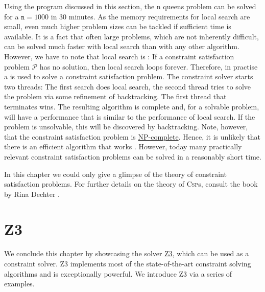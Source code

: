 Using the program discussed in this section, the n queens problem can be solved for a $\texttt{n} = 1000$ in
30 minutes.  As the memory requirements for local search are small, even much higher problem sizes can be
tackled if sufficient time is available.  It is a fact that often large problems, which are not inherently
difficult, can be solved much faster with local search than with any other algorithm.  
However, we have to note that local search is :  If a
constraint satisfaction problem $\mathcal{P}$ has no solution, then local search loops forever.  Therefore, in
practise a  is used to solve a constraint satisfaction problem.  The constraint solver
starts two threads: The first search does local search, the second thread tries to solve the problem via some
refinement of backtracking.  The first thread that terminates wins.  The resulting algorithm is complete and,
for a solvable problem, will have a performance that is similar to the performance of local search.  If the
problem is unsolvable, this will   be discovered by backtracking.  Note, however, that the
constraint satisfaction problem is \href{https://en.wikipedia.org/wiki/NP-completeness}{NP-complete}.  Hence,
it is unlikely that there is an efficient algorithm that works .  However, today many practically
relevant constraint satisfaction problems can be solved in a reasonably short time. 

In this chapter we could only give a glimpse of the theory of constraint satisfaction problems.
For further details on the theory of \textsc{Csp}s, consult the book  by Rina Dechter
\cite{dechter:2003}.

\section{Z3}
We conclude this chapter by showcasing the solver
\href{https://www.microsoft.com/en-us/research/project/z3-3/}{Z3}, which can be used as a constraint solver.  
Z3 implements most of the state-of-the-art constraint solving algorithms and is exceptionally powerful.  We
introduce Z3 via a series of examples.

